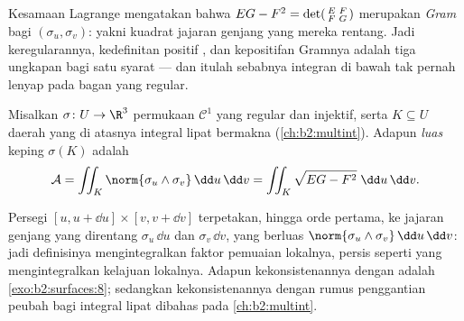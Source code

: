 \begin{remark}
Kesamaan Lagrange mengatakan bahwa $EG - F^2 = \det\begin{psmallmatrix}
E & F\\ F & G\end{psmallmatrix}$ merupakan \emph{
Gram} bagi $(\sigma_u, \sigma_v)$: yakni kuadrat 
jajaran genjang yang mereka rentang. Jadi keregularannya, kedefinitan
positif , dan kepositifan
 Gramnya adalah tiga ungkapan bagi satu syarat ---
dan itulah sebabnya integran  di bawah tak pernah lenyap pada
bagan yang regular.
\end{remark}

\begin{definition}[Luas]\label{def:b2:surfaces:area}
Misalkan $\sigma \colon U \to \R^3$ permukaan $\mathcal{C}^1$ yang regular dan
injektif, serta $K \subseteq U$ daerah  yang di atasnya
integral lipat bermakna (\cref{ch:b2:multint}). Adapun
\emph{luas} keping $\sigma(K)$ adalah
\[
\mathcal{A}
= \iint_K \norm{\sigma_u \wedge \sigma_v}\,\dd u\,\dd v
= \iint_K \sqrt{EG - F^2}\;\dd u\,\dd v .
\]
\end{definition}

\begin{remark}
Persegi  $[u, u + \dd u] \times [v, v + \dd v]$ terpetakan, hingga
orde pertama, ke jajaran genjang yang direntang $\sigma_u\,\dd u$
dan $\sigma_v\,\dd v$, yang berluas $\norm{\sigma_u \wedge
\sigma_v}\,\dd u\,\dd v$: jadi definisinya mengintegralkan faktor
pemuaian  lokalnya, persis seperti  yang mengintegralkan
kelajuan lokalnya. Adapun kekonsistenannya dengan  adalah
\cref{exo:b2:surfaces:8}; sedangkan kekonsistenannya dengan rumus penggantian
peubah bagi integral lipat dibahas pada
\cref{ch:b2:multint}.
\end{remark}

